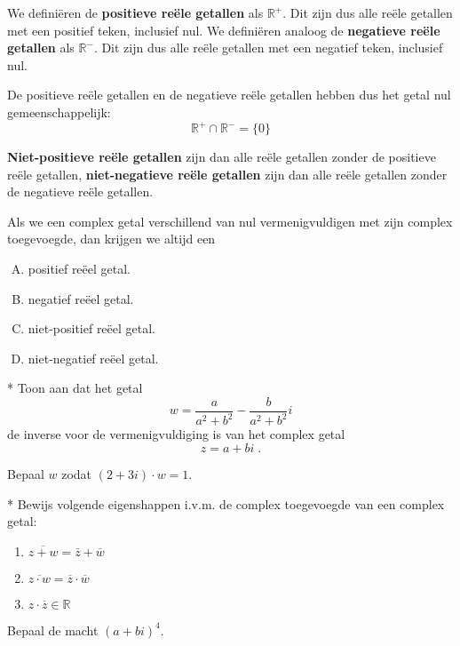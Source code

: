 \documentclass[12pt,twoside,a4]{article}
\begin{document}
\begin{oefening}
  We definiëren de {\bf positieve reële getallen} als $\mathbb{R}^+$. Dit zijn dus alle reële getallen met een positief teken, inclusief nul. We definiëren analoog de {\bf negatieve reële getallen} als $\mathbb{R}^-$. Dit zijn dus alle reële getallen met een negatief teken, inclusief nul.

  De positieve reële getallen en de negatieve reële getallen hebben dus het getal nul gemeenschappelijk:
  $$\mathbb{R}^+\cap\mathbb{R}^-=\{0\}$$

  {\bf Niet-positieve reële getallen} zijn dan alle reële getallen zonder de positieve reële getallen, {\bf niet-negatieve reële getallen} zijn dan alle reële getallen zonder de negatieve reële getallen.

  Als we een complex getal verschillend van nul vermenigvuldigen met zijn complex toegevoegde, dan krijgen we altijd een
  \begin{enumerate}[(A)]
  \item positief reëel getal.
  \item negatief reëel getal.
  \item niet-positief reëel getal.
  \item niet-negatief reëel getal.
  \end{enumerate}
\end{oefening}

\begin{oefening}*
Toon aan dat het getal
$$w=\dfrac{a}{a^2+b^2}-\dfrac{b}{a^2+b^2}i$$
de inverse voor de vermenigvuldiging is van het complex getal
$$z=a+bi\;.$$
\end{oefening}

\begin{oefening}
Bepaal $w$ zodat $(2+3i)\cdot w = 1$.
\end{oefening}

\begin{oefening}*
Bewijs volgende eigenshappen i.v.m. de complex toegevoegde van een complex getal:
\begin{enumerate}[a]
  \item $\overline{z+w}=\overline{z}+\overline{w}$
  \item $\overline{z\cdot w}=\overline{z}\cdot\overline{w}$
  \item $z\cdot\overline{z}\in\mathbb{R}$
\end{enumerate}
\end{oefening}

\begin{oefening}
Bepaal de macht $(a+bi)^4$.
\end{oefening}
\end{document}
